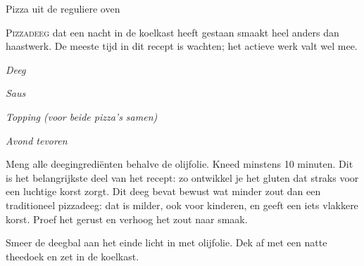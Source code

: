 \begin{recipe}{Pizza uit de reguliere oven}


\lettrine{P}{izzadeeg} dat een nacht in de koelkast heeft gestaan smaakt heel anders
dan haastwerk. De meeste tijd in dit recept is wachten; het actieve werk valt wel
mee.


\noindent\textit{Deeg}
\begin{ingredients}
\end{ingredients}

\medskip
\noindent\textit{Saus}
\begin{ingredients}
\end{ingredients}

\medskip
\noindent\textit{Topping (voor beide pizza's samen)}
\begin{ingredients}
\end{ingredients}


\medskip
\noindent\textit{Avond tevoren}
\begin{steps}
  \item Meng alle deegingrediënten behalve de olijfolie. Kneed minstens
        10 minuten. Dit is het belangrijkste deel van het recept: zo ontwikkel
        je het gluten dat straks voor een luchtige korst zorgt. Dit deeg bevat
        bewust wat minder zout dan een traditioneel pizzadeeg: dat is milder,
        ook voor kinderen, en geeft een iets vlakkere korst. Proef het gerust
        en verhoog het zout naar smaak.
  \item Smeer de deegbal aan het einde licht in met olijfolie. Dek af met een
        natte theedoek en zet in de koelkast.
\end{steps}


\end{recipe}
